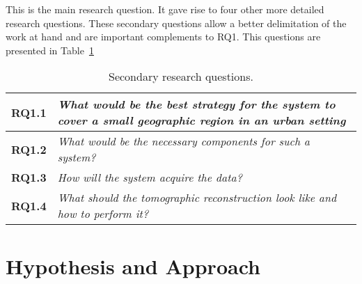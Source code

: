 This is the main research question. It gave rise to four other more
detailed research questions. These secondary questions allow a better
delimitation of the work at hand and are important complements to RQ1.
This questions are presented in Table~\ref{tab:sec_RQ}

\begin{table}[htpb]
    \centering
    \label{tab:sec_RQ}
    \caption{Secondary research questions.}
    \begin{tabularx}{0.8\textwidth}{cX}
        \toprule
        \textbf{RQ1.1}&\emph{ What would be the best strategy
        for the system to cover a small geographic region in an urban
        setting }\\
        \midrule
        \textbf{RQ1.2}&\emph{ What would be the necessary
        components for such a system? }\\
        \midrule
        \textbf{RQ1.3}&\emph{ How will the system acquire the
        data? }\\
        \midrule
        \textbf{RQ1.4}&\emph{ What should the tomographic
        reconstruction look like and how to perform it? }\\
        \bottomrule
    \end{tabularx}
\end{table}



\section{Hypothesis and Approach}%
\label{sec:hypothesis_and_approach}


